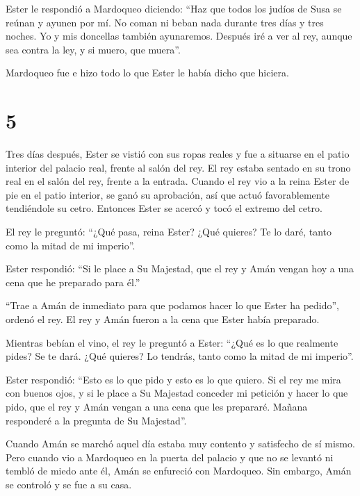  Ester le respondió a Mardoqueo diciendo: 
``Haz que todos los judíos de Susa se reúnan y ayunen por mí. No coman
ni beban nada durante tres días y tres noches. Yo y mis doncellas
también ayunaremos. Después iré a ver al rey, aunque sea contra la ley,
y si muero, que muera''.

 Mardoqueo fue e hizo todo lo que Ester le había dicho que
hiciera.

\hypertarget{section-4}{%
\section{5}\label{section-4}}

 Tres días después, Ester se vistió con sus ropas reales y
fue a situarse en el patio interior del palacio real, frente al salón
del rey. El rey estaba sentado en su trono real en el salón del rey,
frente a la entrada.  Cuando el rey vio a la reina Ester de
pie en el patio interior, se ganó su aprobación, así que actuó
favorablemente tendiéndole su cetro. Entonces Ester se acercó y tocó el
extremo del cetro.

 El rey le preguntó: ``¿Qué pasa, reina Ester? ¿Qué quieres?
Te lo daré, tanto como la mitad de mi imperio''.

 Ester respondió: ``Si le place a Su Majestad, que el rey y
Amán vengan hoy a una cena que he preparado para él.''

 ``Trae a Amán de inmediato para que podamos hacer lo que
Ester ha pedido'', ordenó el rey. El rey y Amán fueron a la cena que
Ester había preparado.

 Mientras bebían el vino, el rey le preguntó a Ester: ``¿Qué
es lo que realmente pides? Se te dará. ¿Qué quieres? Lo tendrás, tanto
como la mitad de mi imperio''.

 Ester respondió: ``Esto es lo que pido y esto es lo que
quiero.  Si el rey me mira con buenos ojos, y si le place a
Su Majestad conceder mi petición y hacer lo que pido, que el rey y Amán
vengan a una cena que les prepararé. Mañana responderé a la pregunta de
Su Majestad''.

 Cuando Amán se marchó aquel día estaba muy contento y
satisfecho de sí mismo. Pero cuando vio a Mardoqueo en la puerta del
palacio y que no se levantó ni tembló de miedo ante él, Amán se
enfureció con Mardoqueo.  Sin embargo, Amán se controló y
se fue a su casa.

